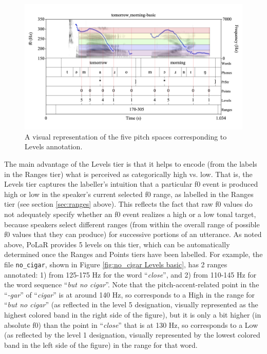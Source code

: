 \documentclass[11pt, twoside]{memoir}
\def\langtext#1{\textit{#1}}
\begin{document}
\begin{figure}[H]
\centering
\includegraphics[width=.875\linewidth]{Levels-tomorrow_morning-basic.png}
\caption{A visual representation of the five pitch spaces corresponding to Levels annotation.
\label{fig:tomorrow_morning Levels basic}
}
\end{figure}
The main advantage of the Levels tier is that it helps to encode (from the labels in the Ranges tier) what is perceived as categorically high vs. low. That is, the Levels tier captures the labeller’s intuition that a particular f0 event is produced high or low in the speaker’s current selected f0 range, as labelled in the Ranges tier (see section \ref{sec:ranges} above). This reflects the fact that raw f0 values do not adequately specify whether an f0 event realizes a high or a low tonal target, because speakers select different ranges (from within the overall range of possible f0 values that they can produce) for successive portions of an utterance. As noted above, PoLaR provides 5 levels on this tier, which can be automatically determined once the Ranges and Points tiers have been labelled.
For example, the file \texttt{no\_cigar}, shown in Figure \ref{fig:no_cigar Levels basic}, has 2 ranges annotated: 1) from 125-175 Hz for the word “\langtext{close}”, and 2) from 110-145 Hz for the word sequence “\langtext{but no cigar}”. Note that the pitch-accent-related point in the “\langtext{-gar}” of “\langtext{cigar}” is at around 140 Hz, so corresponds to a High in the range for “\langtext{but no cigar}” (as reflected in the level 5 designation, visually represented as the highest colored band in the right side of the figure), but it is only a bit higher (in absolute f0) than the point in “\langtext{close}” that is at 130 Hz, so corresponds to a Low (as reflected by the level 1 designation, visually represented by the lowest colored band in the left side of the figure) in the range for that word.
\end{document}
